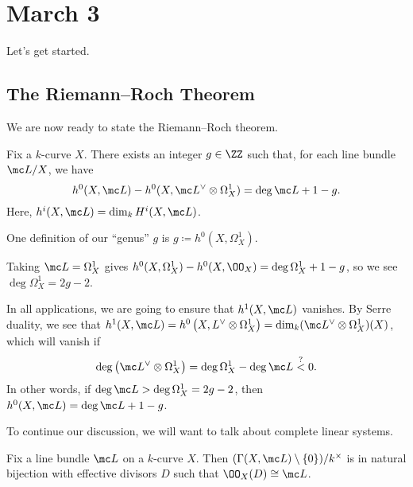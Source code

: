 \documentclass[../notes.tex]{subfiles}
\begin{document}
\section{March 3}

Let's get started.

\subsection{The Riemann--Roch Theorem}
We are now ready to state the Riemann--Roch theorem.
\begin{theorem}
	Fix a $k$-curve $X$. There exists an integer $g\in\ZZ$ such that, for each line bundle $\mc L/X$, we have
	\[h^0(X,\mc L)-h^0(X,\mc L^\lor\otimes\Omega^1_X)=\deg\mc L+1-g.\]
	Here, $h^i(X,\mc L)=\dim_kH^i(X,\mc L)$.
\end{theorem}
\begin{remark}
	One definition of our ``genus'' $g$ is $g\coloneqq h^0\left(X,\Omega^1_X\right)$.
\end{remark}
\begin{example}
	Taking $\mc L=\Omega^1_X$ gives $h^0(X,\Omega^1_X)-h^0(X,\OO_X)=\deg\Omega^1_X+1-g$, so we see $\deg\Omega^1_X=2g-2$.
\end{example}
\begin{example} \label{ex:use-rr}
	In all applications, we are going to ensure that $h^1(X,\mc L)$ vanishes. By Serre duality, we see that $h^1(X,\mc L)=h^0\left(X,L^\lor\otimes\Omega^1_X\right)=\dim_k(\mc L^\lor\otimes\Omega^1_X)(X)$, which will vanish if
	\[\deg\left(\mc L^{\lor}\otimes\Omega^1_X\right)=\deg\Omega^1_X-\deg\mc L\stackrel?<0.\]
	In other words, if $\deg\mc L>\deg\Omega^1_X=2g-2$, then $h^0(X,\mc L)=\deg\mc L+1-g$.
\end{example}
To continue our discussion, we will want to talk about complete linear systems.
\begin{proposition}
	Fix a line bundle $\mc L$ on a $k$-curve $X$. Then $(\Gamma(X,\mc L)\setminus\{0\})/k^\times$ is in natural bijection with effective divisors $D$ such that $\OO_X(D)\cong\mc L$.
\end{proposition}
\end{document}
